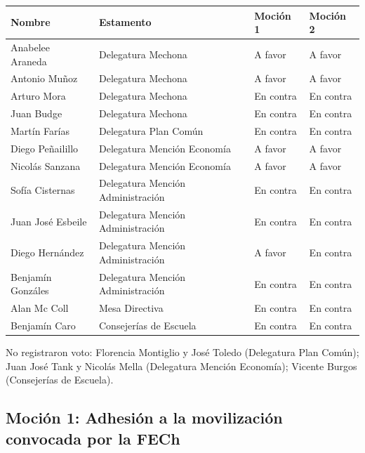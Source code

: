 \documentclass[12pt,letterpaper]{article}
\begin{document}
\begin{center}
\small\setlength{\tabcolsep}{4pt}
\begin{tabular}{L{4.3cm} L{6.2cm} C{2.2cm} C{2.2cm}}
  \toprule
  \textbf{Nombre} & \textbf{Estamento} & \textbf{Moción 1} & \textbf{Moción 2} \\
  \midrule
  Anabelee Araneda      & Delegatura Mechona                & A favor   & A favor   \\
  Antonio Muñoz         & Delegatura Mechona                & A favor   & A favor   \\
  Arturo Mora           & Delegatura Mechona                & En contra & En contra \\
  Juan Budge            & Delegatura Mechona                & En contra & En contra \\
  \midrule
  Martín Farías         & Delegatura Plan Común             & En contra & En contra \\
  \midrule
  Diego Peñailillo      & Delegatura Mención Economía       & A favor   & A favor   \\
  Nicolás Sanzana       & Delegatura Mención Economía       & A favor   & A favor   \\
  \midrule
  Sofía Cisternas       & Delegatura Mención Administración & En contra & En contra \\
  Juan José Esbeile     & Delegatura Mención Administración & En contra & En contra \\
  Diego Hernández       & Delegatura Mención Administración & A favor   & En contra \\
  Benjamín Gonzáles     & Delegatura Mención Administración & En contra & En contra \\
  \midrule
  Alan Mc Coll          & Mesa Directiva                    & En contra & En contra \\
  \midrule
  Benjamín Caro         & Consejerías de Escuela            & En contra & En contra \\
  \bottomrule
\end{tabular}
\end{center}

No registraron voto: Florencia Montiglio y José Toledo (Delegatura Plan Común); Juan José Tank y Nicolás Mella (Delegatura Mención Economía); Vicente Burgos (Consejerías de Escuela).

\subsection{Moción 1: Adhesión a la movilización convocada por la FECh}
\end{document}
